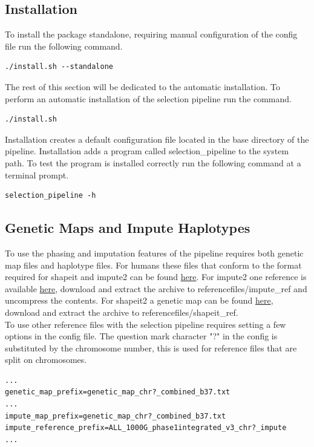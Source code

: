 \documentclass[a4paper,10pt]{article}
\begin{document}
\subsection{Installation}
To install the package standalone, requiring manual configuration of the config file run the following command.\\

\begin{verbatim}
./install.sh --standalone
\end{verbatim}

The rest of this section will be dedicated to the automatic installation. To perform an automatic installation of the selection pipeline run the command.\\
\begin{verbatim}
./install.sh
\end{verbatim}

Installation creates a default configuration file located in the base directory of the pipeline. Installation adds a program called selection\_pipeline to the system path. To test the program is installed correctly run the following command at a terminal prompt.

\begin{verbatim}
selection_pipeline -h
\end{verbatim}

\subsection{Genetic Maps and Impute Haplotypes}
To use the phasing and imputation features of the pipeline requires both genetic map files and haplotype files. For humans these files that conform to the format required for shapeit and impute2 can be found \href{http://mathgen.stats.ox.ac.uk/impute/impute_v2.html#reference}{here}. For impute2 one reference is available \href{http://mathgen.stats.ox.ac.uk/impute/ALL_1000G_phase1integrated_v3_impute_macGT1.tgz}{here}, download and extract the archive to referencefiles/impute\_ref and uncompress the contents. For shapeit2 a genetic map can be found \href{http://www.shapeit.fr/files/genetic_map_b37.tar.gz}{here}, download and extract the archive to referencefiles/shapeit\_ref.\\

To use other reference files with the selection pipeline requires setting a few options in the config file. The question mark character "?" in the config is substituted by the chromosome number, this is used for reference files that are split on chromosomes.\\
\begin{verbatim}
...
genetic_map_prefix=genetic_map_chr?_combined_b37.txt
...
impute_map_prefix=genetic_map_chr?_combined_b37.txt
impute_reference_prefix=ALL_1000G_phase1integrated_v3_chr?_impute
...
\end{verbatim}
\end{document}
